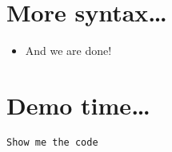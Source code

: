 \documentclass[11pt]{article}
\begin{document}
\section*{More syntax\ldots{}}
\label{sec:org709d700}

\begin{itemize}
\item And we are done!
\end{itemize}

\section*{Demo time\ldots{}}
\label{sec:org22988ab}

\texttt{Show me the code}
\end{document}
